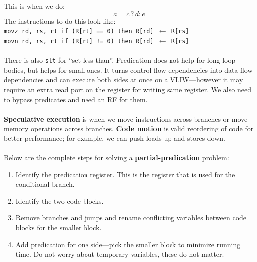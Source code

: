\documentclass{article}
\begin{document}
This is when we do:
$$ a = c \, ? \, d : e $$
The instructions to do this look like: \\
\texttt{movz rd, rs, rt \hspace{3cm} if (R[rt] == 0) then R[rd] $\leftarrow$ R[rs]} \\
\texttt{movn rd, rs, rt \hspace{3cm} if (R[rt] != 0) then R[rd] $\leftarrow$ R[rs]} \\
\\
There is also \texttt{slt} for ``set less than''. Predication does not help for long loop bodies, but helps for small ones. It turns control flow dependencies into data flow dependencies and can execute both sides at once on a VLIW---however it may require an extra read port on the register for writing same register. We also need to bypass predicates and need an RF for them. \\
\\
\textbf{Speculative execution} is when we move instructions across branches or move memory operations across branches. \textbf{Code motion} is valid reordering of code for better performance; for example, we can push loads up and stores down. \\
\\
Below are the complete steps for solving a \textbf{partial-predication} problem:
\begin{enumerate}
\item Identify the predication register. This is the register that is used for the conditional branch.
\item Identify the two code blocks.
\item Remove branches and jumps and rename conflicting variables between code blocks for the smaller block.
\item Add predication for one side---pick the smaller block to minimize running time. Do not worry about temporary variables, these do not matter.
\end{enumerate}
\end{document}
